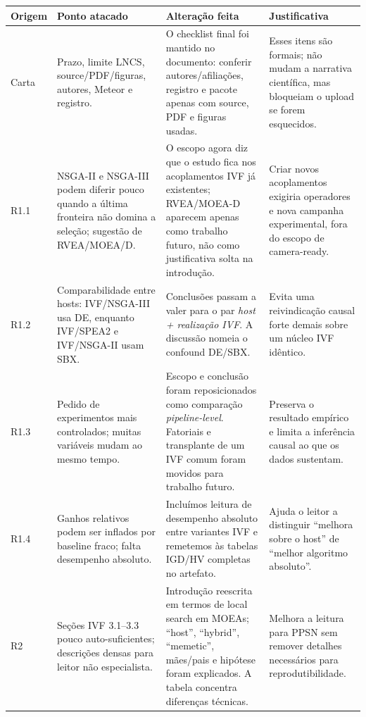 \documentclass[10pt]{article}
\begin{document}
\footnotesize
\begin{longtable}{@{}L{1.35cm}L{4.25cm}L{6.35cm}L{4.25cm}@{}}
\toprule
\textbf{Origem} & \textbf{Ponto atacado} & \textbf{Altera\c{c}\~ao feita} & \textbf{Justificativa} \\
\midrule
\endhead
Carta &
Prazo, limite LNCS, source/PDF/figuras, autores, Meteor e registro. &
O checklist final foi mantido no documento: conferir autores/afilia\c{c}\~oes, registro e pacote apenas com source, PDF e figuras usadas. &
Esses itens s\~ao formais; n\~ao mudam a narrativa cient\'ifica, mas bloqueiam o upload se forem esquecidos. \\
\addlinespace
R1.1 &
NSGA-II e NSGA-III podem diferir pouco quando a \'ultima fronteira n\~ao domina a sele\c{c}\~ao; sugest\~ao de RVEA/MOEA/D. &
O escopo agora diz que o estudo fica nos acoplamentos IVF j\'a existentes; RVEA/MOEA-D aparecem apenas como trabalho futuro, n\~ao como justificativa solta na introdu\c{c}\~ao. &
Criar novos acoplamentos exigiria operadores e nova campanha experimental, fora do escopo de camera-ready. \\
\addlinespace
R1.2 &
Comparabilidade entre hosts: IVF/NSGA-III usa DE, enquanto IVF/SPEA2 e IVF/NSGA-II usam SBX. &
Conclus\~oes passam a valer para o par \emph{host + realiza\c{c}\~ao IVF}. A discuss\~ao nomeia o confound DE/SBX. &
Evita uma reivindica\c{c}\~ao causal forte demais sobre um n\'ucleo IVF id\^entico. \\
\addlinespace
R1.3 &
Pedido de experimentos mais controlados; muitas vari\'aveis mudam ao mesmo tempo. &
Escopo e conclus\~ao foram reposicionados como compara\c{c}\~ao \emph{pipeline-level}. Fatoriais e transplante de um IVF comum foram movidos para trabalho futuro. &
Preserva o resultado emp\'irico e limita a infer\^encia causal ao que os dados sustentam. \\
\addlinespace
R1.4 &
Ganhos relativos podem ser inflados por baseline fraco; falta desempenho absoluto. &
Inclu\'imos leitura de desempenho absoluto entre variantes IVF e remetemos \`as tabelas IGD/HV completas no artefato. &
Ajuda o leitor a distinguir ``melhora sobre o host'' de ``melhor algoritmo absoluto''. \\
\addlinespace
R2 &
Se\c{c}\~oes IVF 3.1--3.3 pouco auto-suficientes; descri\c{c}\~oes densas para leitor n\~ao especialista. &
Introdu\c{c}\~ao reescrita em termos de local search em MOEAs; ``host'', ``hybrid'', ``memetic'', m\~aes/pais e hip\'otese foram explicados. A tabela concentra diferen\c{c}as t\'ecnicas. &
Melhora a leitura para PPSN sem remover detalhes necess\'arios para reprodutibilidade. \\

\end{longtable}
\end{document}
